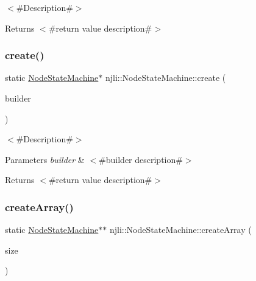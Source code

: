 $<$\#\+Description\#$>$

\begin{DoxyReturn}{Returns}
$<$\#return value description\#$>$ 
\end{DoxyReturn}
\mbox{\label{classnjli_1_1_node_state_machine_a730ed058da4c921083b93eb7b90a62c4}} 
\subsubsection{\texorpdfstring{create()}{create()}\hspace{0.1cm}{\footnotesize\ttfamily [2/2]}}
{\footnotesize\ttfamily static \mbox{\hyperlink{classnjli_1_1_node_state_machine}{Node\+State\+Machine}}$\ast$ njli\+::\+Node\+State\+Machine\+::create (\begin{DoxyParamCaption}\item[{const \mbox{\hyperlink{classnjli_1_1_node_state_machine_builder}{Node\+State\+Machine\+Builder}} \&}]{builder }\end{DoxyParamCaption})\hspace{0.3cm}{\ttfamily [static]}}

$<$\#\+Description\#$>$


\begin{DoxyParams}{Parameters}
{\em builder} & $<$\#builder description\#$>$\\
\hline
\end{DoxyParams}
\begin{DoxyReturn}{Returns}
$<$\#return value description\#$>$ 
\end{DoxyReturn}
\mbox{\label{classnjli_1_1_node_state_machine_ad5c7d8fcb8a5e273ca9e6d847bb53f01}} 
\subsubsection{\texorpdfstring{create\+Array()}{createArray()}}
{\footnotesize\ttfamily static \mbox{\hyperlink{classnjli_1_1_node_state_machine}{Node\+State\+Machine}}$\ast$$\ast$ njli\+::\+Node\+State\+Machine\+::create\+Array (\begin{DoxyParamCaption}\item[{const \mbox{\hyperlink{_util_8h_a10e94b422ef0c20dcdec20d31a1f5049}{u32}}}]{size }\end{DoxyParamCaption})\hspace{0.3cm}{\ttfamily [static]}}


